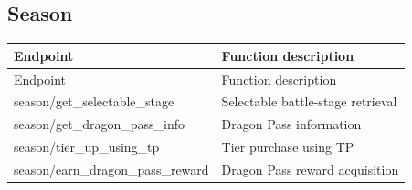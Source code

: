 \subsection{Season}

\begin{longtable}{>{\ttfamily}p{}p{}}
\toprule
Endpoint & Function description \\
\midrule
\endfirsthead%

\toprule
Endpoint & Function description \\
\midrule
\endhead%

season/get\_selectable\_stage
    & Selectable battle-stage retrieval \\

season/get\_dragon\_pass\_info
    & Dragon Pass information \\

season/tier\_up\_using\_tp
    & Tier purchase using TP \\

season/earn\_dragon\_pass\_reward
    & Dragon Pass reward acquisition \\

\bottomrule
\end{longtable}